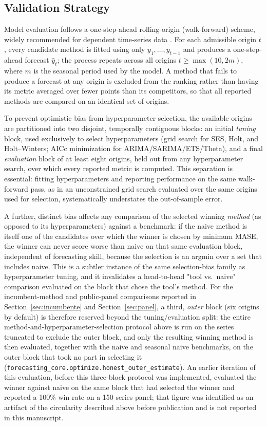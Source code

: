 \documentclass[forecasting,article,submit,pdftex,moreauthors]{Definitions/mdpi}
\begin{document}
\subsection{Validation Strategy}
\label{sec:validation}

Model evaluation follows a one-step-ahead rolling-origin (walk-forward) scheme, widely recommended for dependent time-series data \cite{bergmeir2012,tashman2000}. For each admissible origin $t$, every candidate method is fitted using only $y_1,\dots,y_{t-1}$ and produces a one-step-ahead forecast $\hat y_t$; the process repeats across all origins $t \geq \max(10, 2m)$, where $m$ is the seasonal period used by the model. A method that fails to produce a forecast at any origin is excluded from the ranking rather than having its metric averaged over fewer points than its competitors, so that all reported methods are compared on an identical set of origins.

To prevent optimistic bias from hyperparameter selection, the available origins are partitioned into two disjoint, temporally contiguous blocks: an initial \emph{tuning} block, used exclusively to select hyperparameters (grid search for SES, Holt, and Holt--Winters; AICc minimization for ARIMA/SARIMA/ETS/Theta), and a final \emph{evaluation} block of at least eight origins, held out from any hyperparameter search, over which every reported metric is computed. This separation is essential: fitting hyperparameters and reporting performance on the same walk-forward pass, as in an unconstrained grid search evaluated over the same origins used for selection, systematically understates the out-of-sample error.

A further, distinct bias affects any comparison of the selected winning \emph{method} (as opposed to its hyperparameters) against a benchmark: if the naive method is itself one of the candidates over which the winner is chosen by minimum MASE, the winner can never score worse than naive on that same evaluation block, independent of forecasting skill, because the selection is an argmin over a set that includes naive. This is a subtler instance of the same selection-bias family as hyperparameter tuning, and it invalidates a head-to-head "tool vs.\ naive" comparison evaluated on the block that chose the tool's method. For the incumbent-method and public-panel comparisons reported in Section~\ref{sec:incumbente} and Section~\ref{sec:panel}, a third, \emph{outer} block (six origins by default) is therefore reserved beyond the tuning/evaluation split: the entire method-and-hyperparameter-selection protocol above is run on the series truncated to exclude the outer block, and only the resulting winning method is then evaluated, together with the naive and seasonal naive benchmarks, on the outer block that took no part in selecting it (\texttt{forecasting\_core.optimize.honest\_outer\_estimate}). An earlier iteration of this evaluation, before this three-block protocol was implemented, evaluated the winner against naive on the same block that had selected the winner and reported a 100\% win rate on a 150-series panel; that figure was identified as an artifact of the circularity described above before publication and is not reported in this manuscript.
\end{document}

